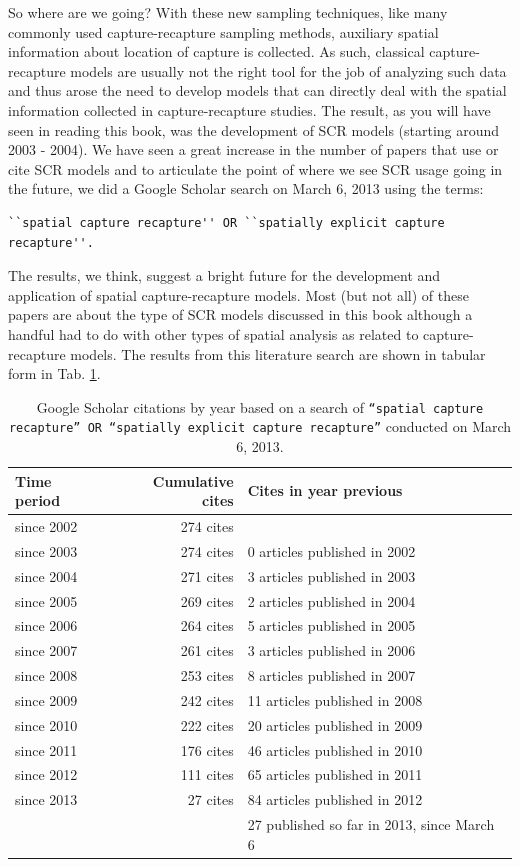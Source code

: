 So where are we going? With these new sampling techniques, like many commonly used capture-recapture
sampling methods,
auxiliary spatial information about location of capture is collected. As such, classical capture-recapture
models are usually not the right tool for the job of analyzing such data and thus arose the need to develop
models that can directly deal with the spatial information collected in capture-recapture studies. 
The result, as you will have seen in reading this book, was the development of SCR models (starting around
2003 - 2004). We have seen a great increase in the number of papers that use or cite SCR models and to 
articulate the point of where we see SCR usage going in the future, we did a Google Scholar search on 
March 6, 2013 using the terms:
\begin{verbatim}
``spatial capture recapture'' OR ``spatially explicit capture recapture''.
\end{verbatim}
The results, we think, suggest a bright future
for the development and application of spatial capture-recapture
models. Most (but not all) of these papers are about the type of SCR models
discussed in this book although a handful had to
do with other types of spatial analysis as related to
capture-recapture models.
The results from this literature search are shown
in tabular form in Tab. 
\ref{last.tab.cites}.

\begin{table}[ht]
\caption{Google Scholar citations by year based on a search of
\mbox{\tt ``spatial capture recapture'' OR ``spatially explicit
capture recapture''} conducted on March 6, 2013. 
}
\begin{tabular}{lrl} \hline \hline
Time period & Cumulative cites & Cites in year previous \\ \hline
since 2002 & 274 cites & \\
since 2003 & 274 cites &0 articles published in 2002 \\
since 2004 & 271 cites &3 articles published in 2003 \\
since 2005 & 269 cites &2 articles published in 2004 \\
since 2006 & 264 cites &5 articles published in 2005 \\
since 2007 & 261 cites &3 articles published in 2006 \\
since 2008 & 253 cites &8 articles published in 2007 \\
since 2009 & 242 cites &11 articles published in 2008 \\ 
since 2010 & 222 cites &20 articles published in 2009 \\
since 2011 & 176 cites &46 articles published in 2010 \\
since 2012 & 111 cites &65 articles published in 2011 \\
since 2013 & 27 cites &84 articles published in 2012 \\
& &27 published so far in 2013, since March 6
\\ \hline
\end{tabular}
\label{last.tab.cites}
\end{table}

